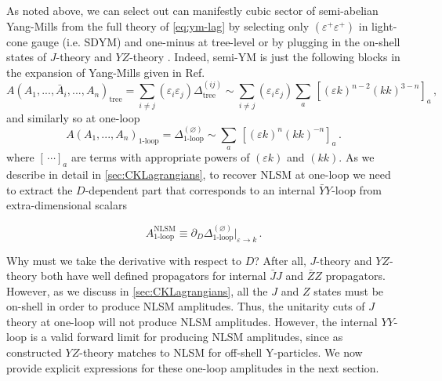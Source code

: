 \documentclass[11pt,letter]{article}
\begin{document}
As noted above, we can select out can manifestly cubic
sector of semi-abelian Yang-Mills from the full theory of \cref{eq:ym-lag} by selecting only $(\varepsilon^+\varepsilon^+)$ in light-cone gauge (i.e. SDYM) and one-minus at tree-level or by plugging in the on-shell states of $J$-theory \cite{Cheung:2020djz,Cheung:2021zvb} and
$YZ$-theory \cite{Cheung:2016prv}. Indeed, semi-YM is just the following blocks
in the expansion of Yang-Mills given in Ref.~\cite{Pavao:2022kog}
\begin{equation}
A(A_1,...,\bar{A}_i,...,A_n)_{\text{tree}} = \sum_{i\neq j} (\varepsilon_i \varepsilon_j) \Delta^{(ij)}_{\text{tree}} \sim \sum_{i\neq j} (\varepsilon_i \varepsilon_j)  \sum_a \,[(\varepsilon k)^{n-2} (kk)^{3-n}]_a\,,
\end{equation}
and similarly so at one-loop
\begin{equation}
A(A_1,...,A_n)_{\text{1-loop}} = \Delta^{(\varnothing)}_{\text{1-loop}} \sim \sum_a\,[ (\varepsilon k)^{n} (kk)^{-n}]_a\, .
\end{equation}
where $[\,\cdots]_a$ are terms with appropriate powers of $(\varepsilon k)$ and $(kk)$. As we describe in detail in \cref{sec:CKLagrangians}, to recover NLSM at one-loop we need to extract the $D$-dependent part
that corresponds to an internal $\bar{Y}Y$-loop from extra-dimensional
scalars
\begin{eBox}
\begin{equation}
A^{\text{NLSM}}_{\text{1-loop}} \equiv \partial_D \Delta^{(\varnothing)}_{\text{1-loop}}\big|_{\varepsilon\rightarrow k}\, .
\end{equation}
\end{eBox}
Why must we take the derivative with respect to $D$? After all,
$J$-theory and $YZ$-theory both have well defined propagators for
internal $\bar{J}J$ and $\bar{Z}Z$ propagators. However, as we discuss
in \cref{sec:CKLagrangians}, all the $J$ and $Z$ states must be on-shell in order to
produce NLSM amplitudes. Thus, the unitarity cuts of $J$ theory at
one-loop will not produce NLSM amplitudes. However, the internal
$YY$-loop is a valid forward limit for producing NLSM amplitudes,
since as constructed $YZ$-theory matches to NLSM for off-shell
Y-particles. We now provide explicit expressions for these one-loop amplitudes in the next section.
\end{document}

